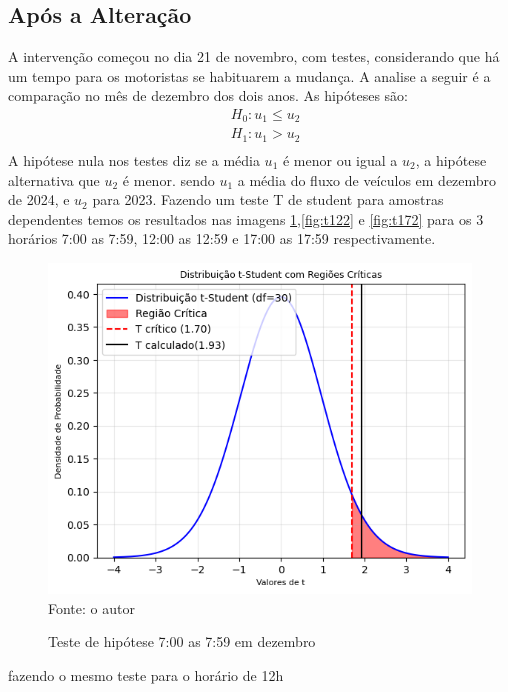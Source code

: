\subsection{Após a Alteração}
A intervenção começou no dia 21 de novembro, com testes, considerando que há um tempo para os motoristas se habituarem a mudança. A analise a seguir é a comparação no mês de dezembro dos dois anos. As hipóteses são:
\begin{equation*}
    \begin{aligned}
     &H_0: u_1 \leq u_2\\
     &H_1: u_1 > u_2\\
    \end{aligned}
\end{equation*}
A hipótese nula nos testes diz se a média \(u_1\) é menor ou igual a \(u_2\), a hipótese alternativa que \(u_2\) é menor. sendo \(u_1\) a média do fluxo de veículos em dezembro de 2024, e \(u_2\) para 2023.
Fazendo um teste T de student para amostras dependentes temos os resultados nas imagens \ref{fig:t72},\ref{fig:t122} e \ref{fig:t172} para os 3 horários 7:00 as 7:59, 12:00 as 12:59 e 17:00 as 17:59 respectivamente.
\begin{figure}[H]
    \centering
    \caption{Teste de hipótese 7:00 as 7:59 em dezembro}
    \includegraphics[width=1\linewidth]{Imagens/72.png}
    {\footnotesize\\ Fonte: o autor}
    \label{fig:t72}
\end{figure}
fazendo o mesmo teste para o horário de 12h
